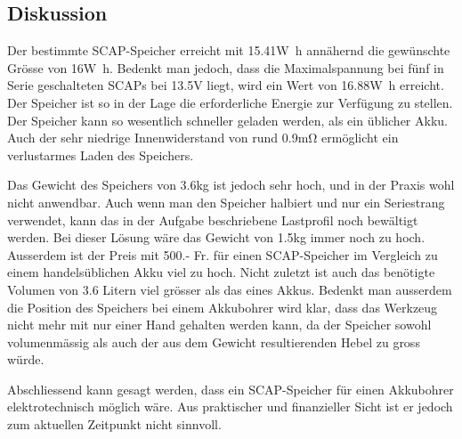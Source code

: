 \documentclass[a4,paper,fleqn]{article}
\begin{document}
\clearpage
\subsection{Diskussion}
Der bestimmte SCAP-Speicher erreicht mit 15.41\si{\watt\hour} annähernd die 
gewünschte Grösse von 16\si{\watt\hour}. Bedenkt man jedoch, dass die 
Maximalspannung bei fünf in Serie geschalteten SCAPs bei 13.5\si{\volt} liegt, 
wird ein Wert von 16.88\si{\watt\hour} erreicht. Der Speicher ist so in der 
Lage die erforderliche Energie zur Verfügung zu stellen. Der Speicher kann so 
wesentlich schneller geladen werden, als ein üblicher Akku. Auch der sehr 
niedrige Innenwiderstand von rund 0.9\si{\milli\ohm} ermöglicht ein 
verlustarmes Laden des Speichers.

\noindent
Das Gewicht des Speichers von 3.6\si{\kilogram} ist jedoch sehr hoch, und in 
der Praxis wohl nicht anwendbar. Auch wenn man den Speicher halbiert und nur 
ein Seriestrang verwendet, kann das in der Aufgabe beschriebene 
Lastprofil noch bewältigt werden. Bei dieser Lösung wäre das Gewicht von 
1.5\si{\kilogram} immer noch zu hoch. Ausserdem ist der Preis mit 500.- Fr. 
für einen SCAP-Speicher im Vergleich zu einem handelsüblichen Akku viel zu 
hoch. Nicht zuletzt ist auch das benötigte Volumen von 3.6 Litern viel grösser 
als das eines Akkus. Bedenkt man ausserdem die Position des Speichers bei 
einem Akkubohrer wird klar, dass das Werkzeug nicht mehr mit nur einer Hand 
gehalten werden kann, da der Speicher sowohl volumenmässig als auch der aus 
dem Gewicht resultierenden Hebel zu gross würde.

\noindent
Abschliessend kann gesagt werden, dass ein SCAP-Speicher für einen Akkubohrer 
elektrotechnisch möglich wäre. Aus praktischer und finanzieller Sicht ist er 
jedoch zum aktuellen Zeitpunkt nicht sinnvoll.
\end{document}
